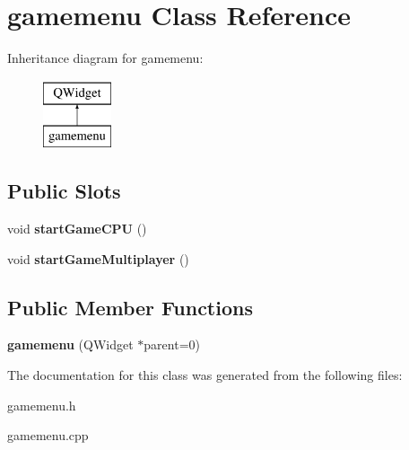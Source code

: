 \hypertarget{classgamemenu}{\section{gamemenu Class Reference}
\label{classgamemenu}
}
Inheritance diagram for gamemenu\-:\begin{figure}[H]
\begin{center}
\leavevmode
\includegraphics[height=2.000000cm]{classgamemenu}
\end{center}
\end{figure}
\subsection*{Public Slots}
\begin{DoxyCompactItemize}
\item 
\hypertarget{classgamemenu_a592d7f6ee78424b63e7725f5b888ccdc}{void {\bfseries start\-Game\-C\-P\-U} ()}\label{classgamemenu_a592d7f6ee78424b63e7725f5b888ccdc}

\item 
\hypertarget{classgamemenu_a1776b37791f330434ff17c17ec0270be}{void {\bfseries start\-Game\-Multiplayer} ()}\label{classgamemenu_a1776b37791f330434ff17c17ec0270be}

\end{DoxyCompactItemize}
\subsection*{Public Member Functions}
\begin{DoxyCompactItemize}
\item 
\hypertarget{classgamemenu_aede0212d7f3c83d4a5d61854ee8cfdca}{{\bfseries gamemenu} (Q\-Widget $\ast$parent=0)}\label{classgamemenu_aede0212d7f3c83d4a5d61854ee8cfdca}

\end{DoxyCompactItemize}


The documentation for this class was generated from the following files\-:\begin{DoxyCompactItemize}
\item 
gamemenu.\-h\item 
gamemenu.\-cpp\end{DoxyCompactItemize}
